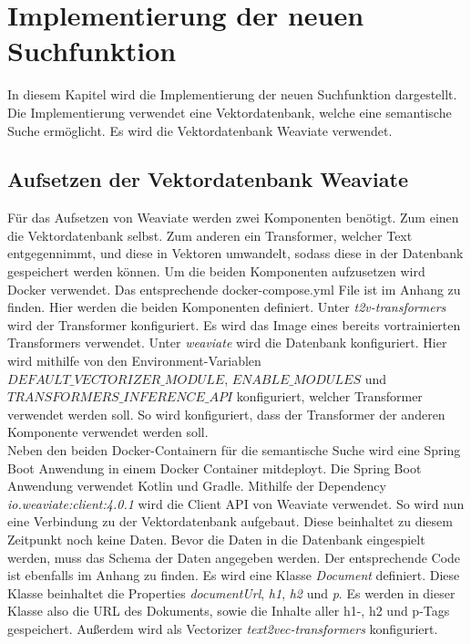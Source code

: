 \chapter{Implementierung der neuen Suchfunktion}
\label{chap:implementierung}
In diesem Kapitel wird die Implementierung der neuen Suchfunktion dargestellt.
Die Implementierung verwendet eine Vektordatenbank, welche eine semantische Suche ermöglicht.
Es wird die Vektordatenbank Weaviate verwendet.

\section{Aufsetzen der Vektordatenbank Weaviate}
Für das Aufsetzen von Weaviate werden zwei Komponenten benötigt.
Zum einen die Vektordatenbank selbst.
Zum anderen ein Transformer, welcher Text entgegennimmt, und diese in Vektoren umwandelt, sodass diese in der Datenbank gespeichert werden können.
Um die beiden Komponenten aufzusetzen wird Docker verwendet.
Das entsprechende docker-compose.yml File ist im Anhang zu finden.
Hier werden die beiden Komponenten definiert.
Unter \textit{t2v-transformers} wird der Transformer konfiguriert.
Es wird das Image eines bereits vortrainierten Transformers verwendet.
Unter \textit{weaviate} wird die Datenbank konfiguriert.
Hier wird mithilfe von den Environment-Variablen \textit{$DEFAULT\_VECTORIZER\_MODULE$}, \textit{$ENABLE\_MODULES$} und \textit{$TRANSFORMERS\_INFERENCE\_API$} konfiguriert, welcher Transformer verwendet werden soll.
So wird konfiguriert, dass der Transformer der anderen Komponente verwendet werden soll.\\

Neben den beiden Docker-Containern für die semantische Suche wird eine Spring Boot Anwendung in einem Docker Container mitdeployt.
Die Spring Boot Anwendung verwendet Kotlin und Gradle.
Mithilfe der Dependency \textit{io.weaviate:client:4.0.1} wird die Client API von Weaviate verwendet.
So wird nun eine Verbindung zu der Vektordatenbank aufgebaut.
Diese beinhaltet zu diesem Zeitpunkt noch keine Daten.
Bevor die Daten in die Datenbank eingespielt werden, muss das Schema der Daten angegeben werden.
Der entsprechende Code ist ebenfalls im Anhang zu finden.
Es wird eine Klasse \textit{Document} definiert.
Diese Klasse beinhaltet die Properties \textit{documentUrl}, \textit{h1}, \textit{h2} und \textit{p}.
Es werden in dieser Klasse also die URL des Dokuments, sowie die Inhalte aller h1-, h2 und p-Tags gespeichert.
Außerdem wird als Vectorizer \textit{text2vec-transformers} konfiguriert.\\

